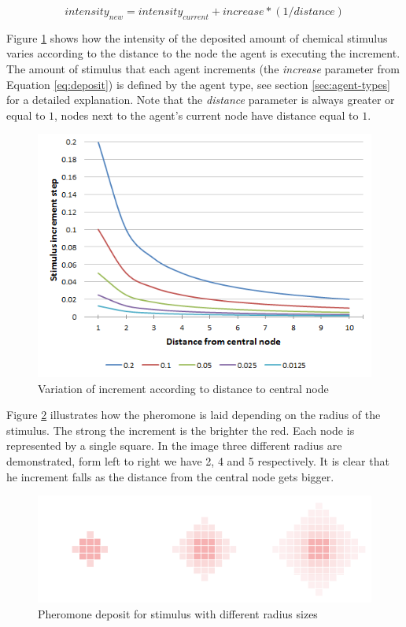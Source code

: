 \begin{equation} \label{eq:deposit}
intensity_{new} =  intensity_{current} + increase * (1 / distance)
\end{equation}

Figure \ref{fig:distanse-vs-inc} shows how the intensity of the deposited amount of chemical stimulus varies according to the distance to the node the agent is executing the increment. The amount of stimulus that each agent increments (the \emph{increase} parameter from Equation \ref{eq:deposit}) is defined by the agent type, see section \ref{sec:agent-types} for a detailed explanation. Note that the \emph{distance} parameter is always greater or equal to $1$, nodes next to the agent's current node have distance equal to $1$.

\begin{figure}[H]
  \centering
  \includegraphics[width=0.5\linewidth]{gfx/distance-vs-increment.png}
  \caption{Variation of increment according to distance to central node}
  \label{fig:distanse-vs-inc}
\end{figure}

Figure \ref{fig:intensity-example} illustrates how the pheromone is laid depending on the radius of the stimulus. The strong the increment is the brighter the red. Each node is represented by a single square. In the image three different radius are demonstrated, form left to right we have 2, 4 and 5 respectively. It is clear that he increment falls as the distance from the central node gets bigger.

\begin{figure}[H]
  \centering
  \includegraphics[width=0.5\linewidth]{gfx/intensity-example.png}
  \caption{Pheromone deposit for stimulus with different radius sizes}
  \label{fig:intensity-example}
\end{figure}

